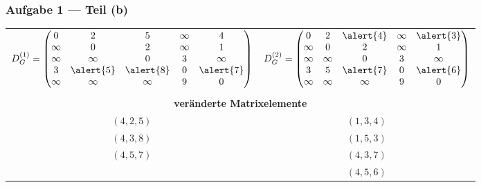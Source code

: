 \documentclass{beamer}
\begin{document}
\begin{frame} \frametitle{Aufgabe 1 --- Teil (b)}
	\begin{tabular}{cc}
		$D_G^{(1)} = \begin{pmatrix}
		0      & 2      & 5      & \infty & 4 \\
		\infty & 0      & 2      & \infty & 1 \\
		\infty & \infty & 0      & 3      & \infty \\
		3      & \alert{5} & \alert{8} & 0      & \alert{7} \\
		\infty & \infty & \infty & 9      & 0
		\end{pmatrix}$
		&
		$D_G^{(2)} = \begin{pmatrix}
		0      & 2      & \alert{4}      & \infty & \alert{3} \\
		\infty & 0      & 2      & \infty & 1 \\
		\infty & \infty & 0      & 3      & \infty \\
		3      & 5      & \alert{7} & 0      & \alert{6} \\
		\infty & \infty & \infty & 9      & 0
		\end{pmatrix}$ \\ \\
		\multicolumn{2}{c}{\textbf{veränderte Matrixelemente}} \\
		$(4,2,5)$ & $(1,3,4)$ \\
		\textcolor{cdgray}{$(4,3,8)$} & $(1,5,3)$ \\
		\textcolor{cdgray}{$(4,5,7)$} & $(4,3,7)$ \\
		          & $(4,5,6)$
	\end{tabular}
\end{frame}
\end{document}
